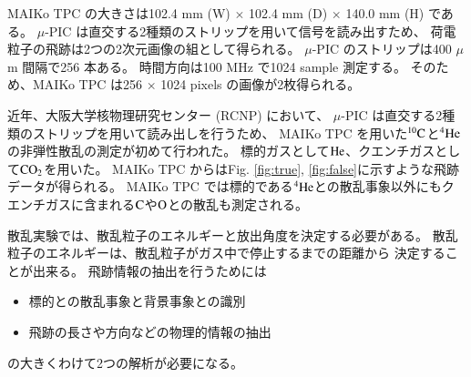 \documentclass{jps-cp}
\begin{document}
MAIKo TPC の大きさは102.4 mm (W) $\times$ 102.4 mm (D) $\times$ 140.0 mm (H) である。
$\mu$-PIC は直交する2種類のストリップを用いて信号を読み出すため、
荷電粒子の飛跡は2つの2次元画像の組として得られる。
$\mu$-PIC のストリップは400 $\mu$m 間隔で256 本ある。
時間方向は100 MHz で1024 sample 測定する。
そのため、MAIKo TPC は256 $\times$ 1024 pixels の画像が2枚得られる。

近年、大阪大学核物理研究センター (RCNP) において、
$\mu$-PIC は直交する2種類のストリップを用いて読み出しを行うため、
MAIKo TPC を用いた${}^{10}\rm{C}$と${}^{4}\rm{He}$の非弾性散乱の測定が初めて行われた。
標的ガスとして$\rm{He}$、クエンチガスとして$\rm{CO}_2$を用いた。
MAIKo TPC からはFig. \ref{fig:true}, \ref{fig:false}に示すような飛跡データが得られる。
MAIKo TPC では標的である${}^{4}\rm{He}$との散乱事象以外にもクエンチガスに含まれる$\rm{C}$や$\rm{O}$との散乱も測定される。

散乱実験では、散乱粒子のエネルギーと放出角度を決定する必要がある。
散乱粒子のエネルギーは、散乱粒子がガス中で停止するまでの距離から
決定することが出来る。
飛跡情報の抽出を行うためには
\begin{itemize}
\item 標的との散乱事象と背景事象との識別
\item 飛跡の長さや方向などの物理的情報の抽出
\end{itemize}
の大きくわけて2つの解析が必要になる。
\end{document}
